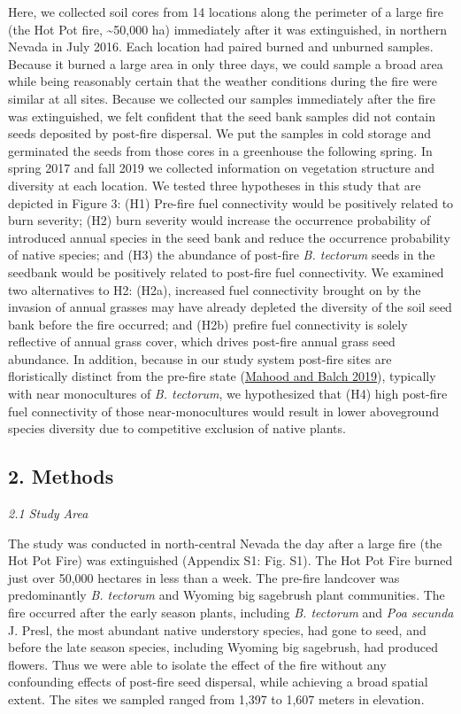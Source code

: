 \documentclass[
  12pt,
]{article}
\begin{document}
Here, we collected soil cores from 14 locations along the perimeter of a
large fire (the Hot Pot fire, \textasciitilde50,000 ha) immediately
after it was extinguished, in northern Nevada in July 2016. Each
location had paired burned and unburned samples. Because it burned a
large area in only three days, we could sample a broad area while being
reasonably certain that the weather conditions during the fire were
similar at all sites. Because we collected our samples immediately after
the fire was extinguished, we felt confident that the seed bank samples
did not contain seeds deposited by post-fire dispersal. We put the
samples in cold storage and germinated the seeds from those cores in a
greenhouse the following spring. In spring 2017 and fall 2019 we
collected information on vegetation structure and diversity at each
location. We tested three hypotheses in this study that are depicted in
Figure 3: (H1) Pre-fire fuel connectivity would be positively related to
burn severity; (H2) burn severity would increase the occurrence
probability of introduced annual species in the seed bank and reduce the
occurrence probability of native species; and (H3) the abundance of
post-fire \emph{B. tectorum} seeds in the seedbank would be positively
related to post-fire fuel connectivity. We examined two alternatives to
H2: (H2a), increased fuel connectivity brought on by the invasion of
annual grasses may have already depleted the diversity of the soil seed
bank before the fire occurred; and (H2b) prefire fuel connectivity is
solely reflective of annual grass cover, which drives post-fire annual
grass seed abundance. In addition, because in our study system post-fire
sites are floristically distinct from the pre-fire state
(\protect\hyperlink{ref-Mahood2019}{Mahood and Balch 2019}), typically
with near monocultures of \emph{B. tectorum}, we hypothesized that (H4)
high post-fire fuel connectivity of those near-monocultures would result
in lower aboveground species diversity due to competitive exclusion of
native plants.

\hypertarget{methods}{%
\subsection{2. Methods}\label{methods}}

\emph{2.1 Study Area}

The study was conducted in north-central Nevada the day after a large
fire (the Hot Pot Fire) was extinguished (Appendix S1: Fig. S1). The Hot
Pot Fire burned just over 50,000 hectares in less than a week. The
pre-fire landcover was predominantly \emph{B. tectorum} and Wyoming big
sagebrush plant communities. The fire occurred after the early season
plants, including \emph{B. tectorum} and \emph{Poa secunda} J. Presl,
the most abundant native understory species, had gone to seed, and
before the late season species, including Wyoming big sagebrush, had
produced flowers. Thus we were able to isolate the effect of the fire
without any confounding effects of post-fire seed dispersal, while
achieving a broad spatial extent. The sites we sampled ranged from 1,397
to 1,607 meters in elevation.
\end{document}

